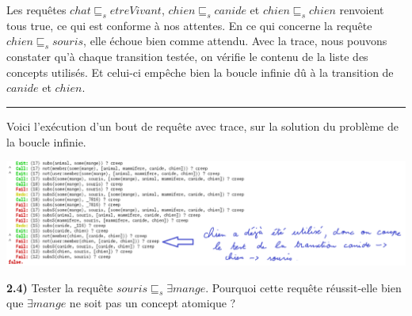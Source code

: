 \documentclass[a4paper,12pt]{report}
\begin{document}
\begin{tcolorbox}[colback=gray!10, colframe=blue!30, coltitle=black, title=Réponse à la question 2.3 - 1/1]

    Les requêtes \(chat \sqsubseteq_s etreVivant\), \(chien \sqsubseteq_s canide\) et \(chien \sqsubseteq_s chien\) renvoient tous true, ce qui est conforme
        à nos attentes. En ce qui concerne la requête \(chien \sqsubseteq_s souris\), elle échoue bien comme attendu. Avec la trace, nous pouvons constater
        qu'à chaque transition testée, on vérifie le contenu de la liste des concepts utilisés. Et celui-ci empêche bien la boucle infinie dû à la transition de
        \(canide\) et \(chien\).

    \vspace{0.5cm}
    \hrule
    \vspace{0.5cm}

    Voici l'exécution d'un bout de requête avec trace, sur la solution du problème de la boucle infinie.
    \begin{center}
        \includegraphics[width=1\textwidth]{./images/chien_souris_not_infini.png}\\[1.5cm]
    \end{center}

\end{tcolorbox}




\newpage

{}

\textbf{2.4)} Tester la requête \(souris \sqsubseteq_s  \exists mange\). Pourquoi cette requête réussit-elle bien que \(\exists mange\) ne soit pas un concept atomique ?



\begin{tcolorbox}[colback=gray!10, colframe=blue!30, coltitle=black, title=Réponse à la question 2.4 - 1/1]



\end{tcolorbox}
\end{document}
